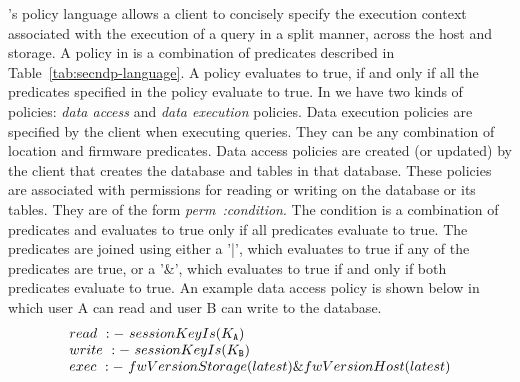 \fi


\project{}'s policy language allows a client to concisely specify the execution context associated with the execution of a query in a split manner, across the host and storage. %
A policy in \project{} is a combination of predicates described in Table~\ref{tab:secndp-language}. A policy evaluates to true, if and only if all the predicates specified in the policy evaluate to true. In \project{} we have two kinds of policies: \emph{data access} and \emph{data execution} policies. Data execution policies are specified by the client when executing queries. They can be any combination of location and firmware predicates. Data access policies are created (or updated) by the client that creates the database and tables in that database. These policies are associated with permissions for reading or writing on the database or its tables. They are of the form \textit{perm~:condition}. The condition is a combination of predicates and evaluates to true only if all predicates evaluate to true. The predicates are joined using either a '|', which evaluates to true if any of the predicates are true, or a '\&', which evaluates to true if and only if both predicates evaluate to true. An example data access policy is shown below in which user A can read and user B can write to the database.
\vspace{-1mm}
\[
\begin{array}{@{}l@{}}
read~:-~sessionKeyIs(K_{\tt A})\\
write~:-~sessionKeyIs(K_{\tt B})\\
exec~:-~fwVersionStorage(latest) \& fwVersionHost(latest)\\
\end{array}
\]

